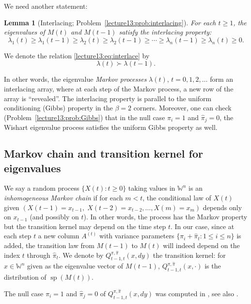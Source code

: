 \documentclass[letterpaper,11pt,oneside,reqno]{book}
\numberwithin{equation}{chapter}  %
\newtheorem{lemma}[proposition]{Lemma}
\theoremstyle{definition}
\begin{document}
We need another statement:
\begin{lemma}[Interlacing; Problem~\ref{lecture13:prob:interlacing}]
\label{lecture13:lemma:interlacing}
For each $t\geq 1$, the eigenvalues of $M(t)$ and $M(t-1)$ satisfy the interlacing property:
\begin{equation}
	\label{lecture13:eq:interlace}
	\lambda_1(t) \geq \lambda_1(t-1) \geq \lambda_2(t) \geq \lambda_2(t-1) \geq \cdots \geq \lambda_n(t-1) \geq \lambda_n(t) \geq 0.
\end{equation}
\end{lemma}
We denote the relation \eqref{lecture13:eq:interlace} by
\begin{equation}
	\label{lecture13:eq:interlace-notation}
	\lambda(t) \succ \lambda(t-1).
\end{equation}

In other words, the eigenvalue \emph{Markov processes}
$\lambda(t)$, $t=0,1,2,\ldots $
form an interlacing array, where at each step of the Markov process,
a new row of the array is ``revealed''.
The interlacing property is parallel to
the uniform conditioning (Gibbs) property in the $\beta=2$ corners. Moreover,
one can check (Problem~\ref{lecture13:prob:Gibbs}) that
in the null case
$\pi_i=1$ and $\hat\pi_j=0$,
the Wishart eigenvalue process satisfies the
uniform Gibbs property as well.

\subsection{Markov chain and transition kernel for eigenvalues}
We say a random process $\{X(t):t\ge0\}$ taking values in
$\mathbb{W}^n$ is an \emph{inhomogeneous Markov chain} if
for each $m<t$, the conditional law of $X(t)$ given
$(X(t-1)=x_{t-1},\;X(t-2)=x_{t-2},\dots,X(m)=x_m)$ depends
only on $x_{t-1}$ (and possibly on $t$). In other words, the
process has the Markov property but the transition kernel
may depend on the time step $t$. In our case, since at each
step $t$ a new column $A^{(t)}$ with variance parameters
$\{\pi_i+\hat\pi_t:1\le i\le n\}$ is added, the transition
law from $M(t-1)$ to $M(t)$ will indeed depend on the index
$t$ through $\hat\pi_t$. We denote by
$Q^{\pi,\hat\pi}_{t-1,t}(x,dy)$ the transition kernel: for
$x\in \mathbb{W}^n$ given as the eigenvalue vector of
$M(t-1)$, $Q^{\pi,\hat\pi}_{t-1,t}(x,\cdot)$ is the
distribution of $\operatorname{sp}(M(t))$.

The null case $\pi_i=1$ and $\hat\pi_j=0$ of $Q^{\pi,\hat\pi}_{t-1,t}(x,dy)$
was computed in \cite{defosseux2010orbit}, see also
\cite{forrester2006jacobians}.
\end{document}
